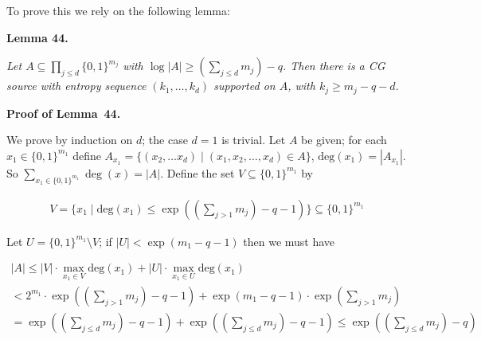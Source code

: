 \documentclass[10pt,a4paper]{article}
\begin{document}
To prove this we rely on the following lemma:\par





\par\medskip\noindent\textbf{
\textbf{Lemma 44}\textbf{.}
}\par



\emph{Let $A\subseteq\prod_{j\leq d}\{0,1\}^{m_{j}}$ with $\log|A|\geq(\sum_{j\leq d}m_{j})-q$. Then there is a CG source with entropy sequence $(k_{1},\ldots,k_{d})$ supported on $A$, with $k_{j}\geq m_{j}-q-d$.}\par







\par\medskip\noindent\textbf{Proof of Lemma 44.}\par




We prove by induction on $d$; the case $d=1$ is trivial. Let $A$ be given; for each $x_{1}\in\{0,1\}^{m_{1}}$ define $A_{x_{1}}=\{(x_{2},\ldots x_{d})\mid(x_{1},x_{2},\ldots,x_{d})\in A\}$, $\mathrm{deg}(x_{1})=|A_{x_{1}}|$. So $\sum_{x_{1}\in\{0,1\}^{m_{1}}}\deg(x)=|A|.$
Define the set $V\subseteq\{0,1\}^{m_{1}}$ by\par


\[\begin{gathered}
V=\{x_{1}\mid\mathrm{deg}(x_{1})\leq\exp((\sum_{j>1}m_{j})-q-1)\}\subseteq\{0,1\}^{m_{1}}
\end{gathered}\]


Let $U=\{0,1\}^{m_{1}}\setminus V$; if $|U|<\exp(m_{1}-q-1)$ then we must have\par




\[\begin{gathered}
\displaystyle|A|\leq|V|\cdot\max_{x_{1}\in V}\mathrm{deg}(x_{1})+|U|\cdot\max_{x_{1}\in U}\mathrm{deg}(x_{1}) \\
\displaystyle<2^{m_{1}}\cdot\exp((\sum_{j>1}m_{j})-q-1)+\exp(m_{1}-q-1)\cdot\exp(\sum_{j>1}m_{j}) \\
\displaystyle=\exp((\sum_{j\leq d}m_{j})-q-1)+\exp((\sum_{j\leq d}m_{j})-q-1)\leq\exp((\sum_{j\leq d}m_{j})-q)
\end{gathered}\]
\end{document}
